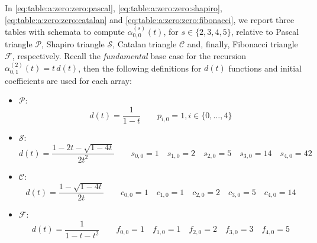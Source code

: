 In \autoref{eq:table:a:zero:zero:pascal}, \autoref{eq:table:a:zero:zero:shapiro}, 
\autoref{eq:table:a:zero:zero:catalan} and \autoref{eq:table:a:zero:zero:fibonacci}, 
we report three tables with schemata to compute
$\alpha_{0,0}^{(s)}(t)$, for $s\in\lbrace 2, 3, 4, 5\rbrace$, relative to 
Pascal triangle $\mathcal{P}$, Shapiro triangle $\mathcal{S}$,
Catalan triangle $\mathcal{C}$ and, finally, Fibonacci triangle $\mathcal{F}$, respectively. 
Recall the \emph{fundamental}
base case for the recursion $\alpha_{0,1}^{(2)}(t) = t\,d(t)$, then the following 
definitions for $d(t)$ functions and initial coefficients are used for each array: 
\begin{itemize}
\item $\mathcal{P}$:
\begin{displaymath}
     d(t) = \frac{1}{1-t} \quad \quad p_{i,0}=1, i\in\lbrace 0,\ldots,4\rbrace
\end{displaymath}

\item $\mathcal{S}$:
\begin{displaymath}
        d(t) = \frac{1-2t-\sqrt{1-4t}}{2t^{2}} \quad \quad 
            s_{0,0}=1\quad s_{1,0}=2\quad s_{2,0}=5\quad s_{3,0}=14\quad s_{4,0}=42
\end{displaymath}

\item $\mathcal{C}$:
\begin{displaymath}
        d(t) = \frac{1-\sqrt{1-4t}}{2t} \quad \quad 
            c_{0,0}=1\quad c_{1,0}=1\quad c_{2,0}=2\quad c_{3,0}=5\quad c_{4,0}=14
\end{displaymath}

\item $\mathcal{F}$:
\begin{displaymath}
        d(t) = \frac{1}{1-t-t^{2}} \quad \quad 
            f_{0,0}=1\quad f_{1,0}=1\quad f_{2,0}=2\quad f_{3,0}=3\quad f_{4,0}=5
\end{displaymath}

\end{itemize}

